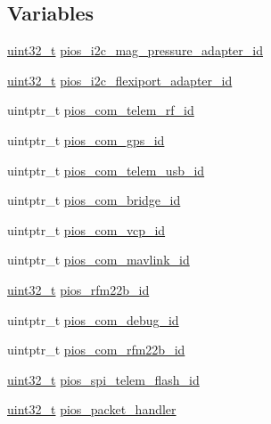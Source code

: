 \subsection*{Variables}
\begin{DoxyCompactItemize}
\item 
\hyperlink{stdint_8h_a435d1572bf3f880d55459d9805097f62}{uint32\-\_\-t} \hyperlink{group___open_pilot_core_ga0bc1cddc7bfac02e5a765f1ff09ad29f}{pios\-\_\-i2c\-\_\-mag\-\_\-pressure\-\_\-adapter\-\_\-id}
\item 
\hyperlink{stdint_8h_a435d1572bf3f880d55459d9805097f62}{uint32\-\_\-t} \hyperlink{group___open_pilot_core_ga20b68de0b754d943d653d816aad86148}{pios\-\_\-i2c\-\_\-flexiport\-\_\-adapter\-\_\-id}
\item 
uintptr\-\_\-t \hyperlink{group___open_pilot_core_gae48e848f715b08971e23528feee79339}{pios\-\_\-com\-\_\-telem\-\_\-rf\-\_\-id}
\item 
uintptr\-\_\-t \hyperlink{group___open_pilot_core_ga05dca72c42c6c2b33fa62b8ee0fcb2ea}{pios\-\_\-com\-\_\-gps\-\_\-id}
\item 
uintptr\-\_\-t \hyperlink{group___open_pilot_core_ga513cc36d72b76de2fcb75ff233a79a4a}{pios\-\_\-com\-\_\-telem\-\_\-usb\-\_\-id}
\item 
uintptr\-\_\-t \hyperlink{group___open_pilot_core_gac040f05fa048688ee0269c2768698a14}{pios\-\_\-com\-\_\-bridge\-\_\-id}
\item 
uintptr\-\_\-t \hyperlink{group___open_pilot_core_gaaeb3e0d65ed5c6e7b921c54e1ad905db}{pios\-\_\-com\-\_\-vcp\-\_\-id}
\item 
uintptr\-\_\-t \hyperlink{group___open_pilot_core_gabdefeb92517c08b2db19b764db941de9}{pios\-\_\-com\-\_\-mavlink\-\_\-id}
\item 
\hyperlink{stdint_8h_a435d1572bf3f880d55459d9805097f62}{uint32\-\_\-t} \hyperlink{group___open_pilot_core_ga1e0b7d2eb8b8640e07daa1f381780972}{pios\-\_\-rfm22b\-\_\-id}
\item 
uintptr\-\_\-t \hyperlink{group___open_pilot_core_ga14dc9e3d330b80a37a9699c2112358e0}{pios\-\_\-com\-\_\-debug\-\_\-id}
\item 
uintptr\-\_\-t \hyperlink{group___open_pilot_core_ga960a23c3c0c4fd41826d65e01651b737}{pios\-\_\-com\-\_\-rfm22b\-\_\-id}
\item 
\hyperlink{stdint_8h_a435d1572bf3f880d55459d9805097f62}{uint32\-\_\-t} \hyperlink{group___open_pilot_core_gabcea731eedc7b51eae0e4074e35fc8c1}{pios\-\_\-spi\-\_\-telem\-\_\-flash\-\_\-id}
\item 
\hyperlink{stdint_8h_a435d1572bf3f880d55459d9805097f62}{uint32\-\_\-t} \hyperlink{group___open_pilot_core_gab0199d5aedb7be35cb1d6880ee21f8ac}{pios\-\_\-packet\-\_\-handler}

\end{DoxyCompactItemize}
